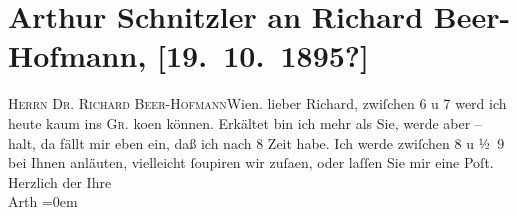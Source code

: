 

         
         \renewcommand{\erwaehntePersonen}{Personen: Richard Beer-Hofmann}
         \renewcommand{\erwaehnteOrte}{Orte: Café Griensteidl, Wien}
         \renewcommand{\erwaehnteWerke}{}
               \section[Arthur Schnitzler an Richard Beer-Hofmann, {[}19. 10. 1895?{]}]{ Arthur Schnitzler an Richard Beer-Hofmann, {[}19. 10. 1895?{]}}\nopagebreak{}\rehead{ }\begin{ledgroupsized}[t]{13cm}\normalsize\beginnumbering{} \toendnotes[C]{\smallbreak\pagebreak[2]} 
\pstart{}{\pb}\textsc{Herrn Dr. Richard Beer-Hofmann}\pend{}\pstart{}Wien.\pend{}{\bigskip}\pstart
           \noindent{}{\pb}lieber Richard, zwiſchen 6 u 7 werd ich
               heute kaum ins \textsc{Gr.} ko{\geminationm}en können. Erkältet bin ich mehr als Sie, werde
               aber – halt, da fällt mir eben ein, daß ich nach 8 Zeit habe. Ich werde
               zwiſchen 8 u ½ 9 bei {\pb}Ihnen
               anläuten, vielleicht ſoupiren wir zuſa{\geminationm}en, oder laſſen
               Sie mir eine Poſt.\pend
           \pstart
           Herzlich der Ihre{\\[\baselineskip]}\spacefill\mbox{Arth}\pend
           \leftskip=0em{}
         
         \endnumbering{}\end{ledgroupsized}  \newcommand{\dateiname}{L00510}\newcommand{\titel}{Arthur Schnitzler an Richard Beer-Hofmann, [19. 10. 1895?]}\newcommand{\editorInnen}{Martin Anton Müller und Gerd-Hermann Susen}
      